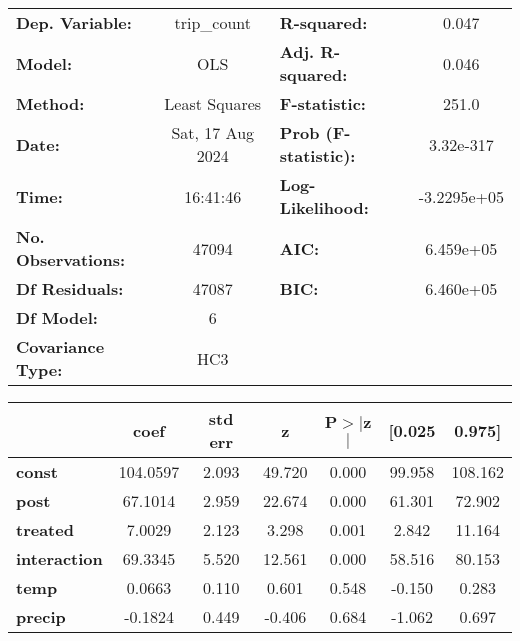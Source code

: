 \begin{center}
\begin{tabular}{lclc}
\toprule
\textbf{Dep. Variable:}    &   trip\_count    & \textbf{  R-squared:         } &      0.047   \\
\textbf{Model:}            &       OLS        & \textbf{  Adj. R-squared:    } &      0.046   \\
\textbf{Method:}           &  Least Squares   & \textbf{  F-statistic:       } &      251.0   \\
\textbf{Date:}             & Sat, 17 Aug 2024 & \textbf{  Prob (F-statistic):} &  3.32e-317   \\
\textbf{Time:}             &     16:41:46     & \textbf{  Log-Likelihood:    } & -3.2295e+05  \\
\textbf{No. Observations:} &       47094      & \textbf{  AIC:               } &  6.459e+05   \\
\textbf{Df Residuals:}     &       47087      & \textbf{  BIC:               } &  6.460e+05   \\
\textbf{Df Model:}         &           6      & \textbf{                     } &              \\
\textbf{Covariance Type:}  &       HC3        & \textbf{                     } &              \\
\bottomrule
\end{tabular}
\begin{tabular}{lcccccc}
                      & \textbf{coef} & \textbf{std err} & \textbf{z} & \textbf{P$> |$z$|$} & \textbf{[0.025} & \textbf{0.975]}  \\
\midrule
\textbf{const}        &     104.0597  &        2.093     &    49.720  &         0.000        &       99.958    &      108.162     \\
\textbf{post}         &      67.1014  &        2.959     &    22.674  &         0.000        &       61.301    &       72.902     \\
\textbf{treated}      &       7.0029  &        2.123     &     3.298  &         0.001        &        2.842    &       11.164     \\
\textbf{interaction}  &      69.3345  &        5.520     &    12.561  &         0.000        &       58.516    &       80.153     \\
\textbf{temp}         &       0.0663  &        0.110     &     0.601  &         0.548        &       -0.150    &        0.283     \\
\textbf{precip}       &      -0.1824  &        0.449     &    -0.406  &         0.684        &       -1.062    &        0.697     \\

\end{tabular}
\end{center}
